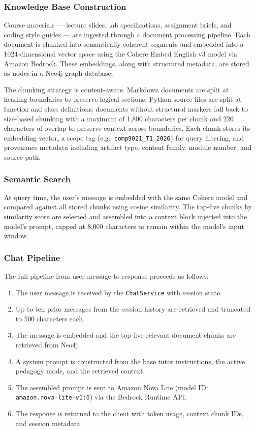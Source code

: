 \subsubsection{Knowledge Base Construction}

Course materials — lecture slides, lab specifications, assignment briefs, and coding style guides — are ingested through a document processing pipeline. Each document is chunked into semantically coherent segments and embedded into a 1024-dimensional vector space using the Cohere Embed English v3 model via Amazon Bedrock. These embeddings, along with structured metadata, are stored as nodes in a Neo4j graph database.

The chunking strategy is content-aware. Markdown documents are split at heading boundaries to preserve logical sections; Python source files are split at function and class definitions; documents without structural markers fall back to size-based chunking with a maximum of 1,800 characters per chunk and 220 characters of overlap to preserve context across boundaries. Each chunk stores its embedding vector, a scope tag (e.g.\ \texttt{comp9021\_T1\_2026}) for query filtering, and provenance metadata including artifact type, content family, module number, and source path.

\subsubsection{Semantic Search}

At query time, the user's message is embedded with the same Cohere model and compared against all stored chunks using cosine similarity. The top-five chunks by similarity score are selected and assembled into a context block injected into the model's prompt, capped at 8,000 characters to remain within the model's input window.

\subsubsection{Chat Pipeline}

The full pipeline from user message to response proceeds as follows:

\begin{enumerate}
    \item The user message is received by the \texttt{ChatService} with session state.
    \item Up to ten prior messages from the session history are retrieved and truncated to 500 characters each.
    \item The message is embedded and the top-five relevant document chunks are retrieved from Neo4j.
    \item A system prompt is constructed from the base tutor instructions, the active pedagogy mode, and the retrieved context.
    \item The assembled prompt is sent to Amazon Nova Lite (model ID: \texttt{amazon.nova-lite-v1:0}) via the Bedrock Runtime API.
    \item The response is returned to the client with token usage, context chunk IDs, and session metadata.
\end{enumerate}

